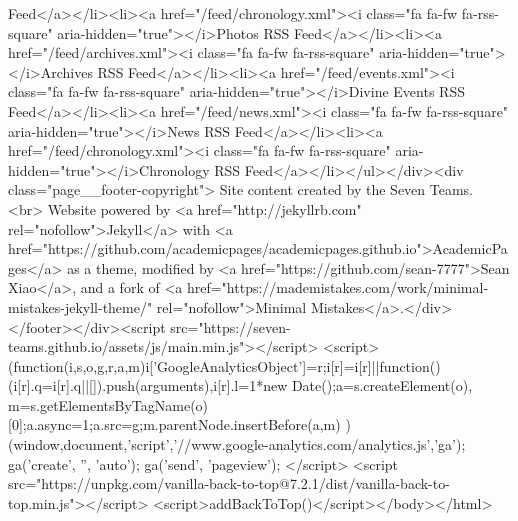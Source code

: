 Feed</a></li><li><a href="/feed/chronology.xml"><i class="fa fa-fw fa-rss-square" aria-hidden="true"></i>Photos RSS Feed</a></li><li><a href="/feed/archives.xml"><i class="fa fa-fw fa-rss-square" aria-hidden="true"></i>Archives RSS Feed</a></li><li><a href="/feed/events.xml"><i class="fa fa-fw fa-rss-square" aria-hidden="true"></i>Divine Events RSS Feed</a></li><li><a href="/feed/news.xml"><i class="fa fa-fw fa-rss-square" aria-hidden="true"></i>News RSS Feed</a></li><li><a href="/feed/chronology.xml"><i class="fa fa-fw fa-rss-square" aria-hidden="true"></i>Chronology RSS Feed</a></li></ul></div><div class="page__footer-copyright"> Site content created by the Seven Teams. <br> Website powered by <a href="http://jekyllrb.com" rel="nofollow">Jekyll</a> with <a href="https://github.com/academicpages/academicpages.github.io">AcademicPages</a> as a theme, modified by <a href="https://github.com/sean-7777">Sean Xiao</a>, and a fork of <a href="https://mademistakes.com/work/minimal-mistakes-jekyll-theme/" rel="nofollow">Minimal Mistakes</a>.</div></footer></div><script src="https://seven-teams.github.io/assets/js/main.min.js"></script> <script> (function(i,s,o,g,r,a,m){i['GoogleAnalyticsObject']=r;i[r]=i[r]||function(){ (i[r].q=i[r].q||[]).push(arguments)},i[r].l=1*new Date();a=s.createElement(o), m=s.getElementsByTagName(o)[0];a.async=1;a.src=g;m.parentNode.insertBefore(a,m) })(window,document,'script','//www.google-analytics.com/analytics.js','ga'); ga('create', '', 'auto'); ga('send', 'pageview'); </script> <script src="https://unpkg.com/vanilla-back-to-top@7.2.1/dist/vanilla-back-to-top.min.js"></script> <script>addBackToTop()</script></body></html>

